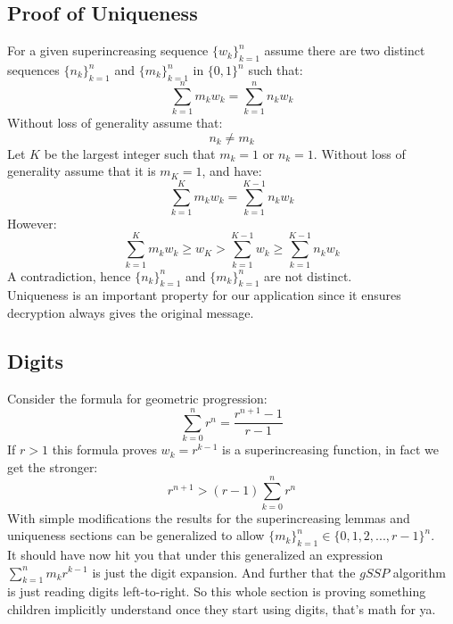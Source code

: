 \subsection{Proof of Uniqueness}
For a given superincreasing sequence $\{w_k\}_{k=1}^n$ assume there are two distinct sequences $\{n_k\}_{k=1}^n$ and $\{m_k\}_{k=1}^n$ in $\{0,1\}^n$ such that:
\[\sum_{k=1}^nm_kw_k = 	\sum_{k=1}^nn_kw_k\]
Without loss of generality assume that:
\[n_k \neq m_k\]
Let $K$ be the largest integer such that $m_k = 1$ or $n_k = 1$.
Without loss of generality assume that it is $m_K = 1$,
and have:
\[\sum_{k=1}^Km_kw_k = 	\sum_{k=1}^{K-1}n_kw_k\]
However:
\[\sum_{k=1}^Km_kw_k \geq w_K > \sum_{k=1}^{K-1}w_k \geq \sum_{k=1}^{K-1}n_kw_k\]
A contradiction,
hence $\{n_k\}_{k=1}^n$ and $\{m_k\}_{k=1}^n$ are not distinct.
\\

Uniqueness is an important property for our application since it ensures decryption always gives the original message.

\subsection{Digits}
Consider the formula for geometric progression:
\[\sum_{k=0}^nr^n = \frac{r^{n+1}-1}{r-1}\]
If $r>1$ this formula proves $w_k = r^{k-1}$ is a superincreasing function,
in fact we get the stronger:
\[r^{n+1} > (r-1)\sum_{k=0}^nr^n\]
With simple modifications the results for the superincreasing lemmas and uniqueness sections can be generalized to allow $\{m_k\}^n_{k=1} \in \{0,1,2,...,r-1\}^n$.
\\

It should have now hit you that under this generalized an expression $\sum_{k=1}^nm_kr^{k-1}$ is just the digit expansion.
And further that the $gSSP$ algorithm is just reading digits left-to-right.
So this whole section is proving something children implicitly understand once they start using digits,
that's math for ya.
